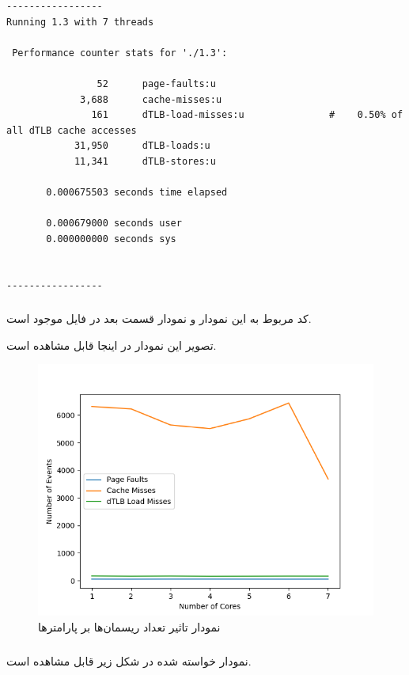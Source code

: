 \documentclass{article}
\begin{document}
\begin{latin}
\begin{lstlisting}
-----------------
Running 1.3 with 7 threads

 Performance counter stats for './1.3':

                52      page-faults:u                                                         
             3,688      cache-misses:u                                                        
               161      dTLB-load-misses:u               #    0.50% of all dTLB cache accesses
            31,950      dTLB-loads:u                                                          
            11,341      dTLB-stores:u                                                         

       0.000675503 seconds time elapsed

       0.000679000 seconds user
       0.000000000 seconds sys


----------------- 
\end{lstlisting}
\end{latin}

\subsubsection{}
کد مربوط به این نمودار و نمودار قسمت بعد در فایل 
موجود است. 

تصویر این نمودار در اینجا قابل مشاهده است. 
\begin{figure}[H]
\centering
\includegraphics[width=\textwidth]{1.3-plot-1.png}
\caption{نمودار تاثیر تعداد ریسمان‌ها بر پارامترها}
\end{figure}

\subsubsection{}
نمودار خواسته شده در شکل زیر قابل مشاهده است. 
\end{document}
